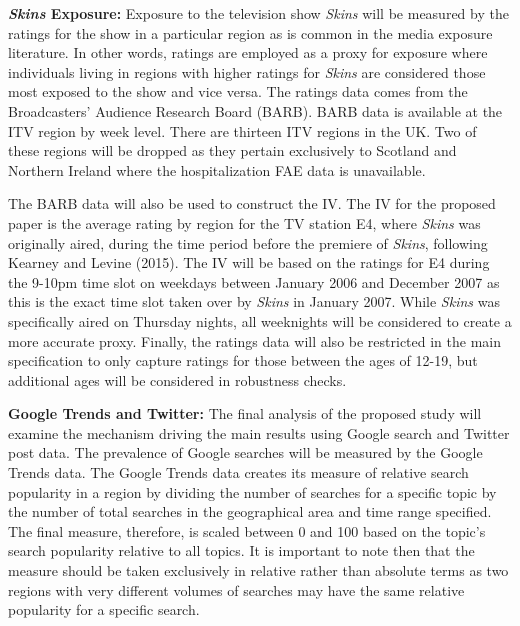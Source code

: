 \documentclass[12pt]{article}
\begin{document}
{\bf \textit{Skins} Exposure:} Exposure to the television show \textit{Skins} will be measured by the ratings for the show in a particular region as is common in the media exposure literature. In other words, ratings are employed as a proxy for exposure where individuals living in regions with higher ratings for \textit{Skins} are considered those most exposed to the show and vice versa. The ratings data comes from the Broadcasters' Audience Research Board (BARB). BARB data is available at the ITV region by week level. There are thirteen ITV regions in the UK. Two of these regions will be dropped as they pertain exclusively to Scotland and Northern Ireland where the hospitalization FAE data is unavailable. 

The BARB data will also be used to construct the IV. The IV for the proposed paper is the average rating by region for the TV station E4, where \textit{Skins} was originally aired, during the time period before the premiere of \textit{Skins}, following Kearney and Levine (2015). The IV will be based on the ratings for E4 during the 9-10pm time slot on weekdays between January 2006 and December 2007 as this is the exact time slot taken over by \textit{Skins} in January 2007. While \textit{Skins} was specifically aired on Thursday nights, all weeknights will be considered to create a more accurate proxy. Finally, the ratings data will also be restricted in the main specification to only capture ratings for those between the ages of 12-19, but additional ages will be considered in robustness checks.


{\bf Google Trends and Twitter:} The final analysis of the proposed study will examine the mechanism driving the main results using Google search and Twitter post data. The prevalence of Google searches will be measured by the Google Trends data. The Google Trends data creates its measure of relative search popularity in a region by dividing the number of searches for a specific topic by the number of total searches in the geographical area and time range specified. The final measure, therefore, is scaled between 0 and 100 based on the topic's search popularity relative to all topics. It is important to note then that the measure should be taken exclusively in relative rather than absolute terms as two regions with very different volumes of searches may have the same relative popularity for a specific search. 
\end{document}
